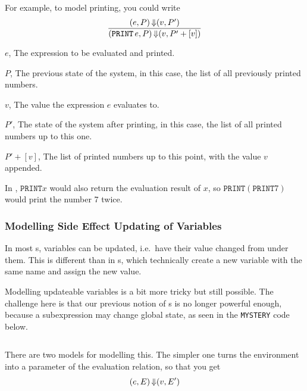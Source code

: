 For example, to model printing, you could write
\begin{equation}\label{eq:Semantic_Side_Effect_Printing}
  \frac{(e, P) \operatorname{\Downarrow} (v, P')}{(\mathtt{PRINT\,} e, P) \operatorname{\Downarrow} (v, P'+[v])}
\end{equation}
\begin{description}[noitemsep]
\item $e$, The expression to be evaluated and printed.
\item $P$, The previous state of the system, in this case, the list of all previously printed numbers.
\item $v$, The value the expression $e$ evaluates to.
\item $P'$, The state of the system after printing, in this case, the list of all printed numbers up to this one.
\item $P'+[v]$, The list of printed numbers up to this point, with the value $v$ appended.
\end{description}

\begin{remark*}
  In , $\mathtt{PRINT} x$ would also return the evaluation result of $x$, so $\mathtt{PRINT} (\mathtt{PRINT} 7)$ would print the number 7 twice.
\end{remark*}

\subsubsection{Modelling Side Effect Updating of Variables}\label{subsubsec:Model_Side_Effect_Variable_Update}
In most s, variables can be updated, i.e.\ have their value changed from under them.
This is different than in s, which technically create a new variable with the same name and assign the new value.

Modelling updateable variables is a bit more tricky but still possible.
The challenge here is that our previous notion of s is no longer powerful enough, because a subexpression may change global state, as seen in the \texttt{MYSTERY} code below.

\inputminted[frame=lines,linenos]{pascal}{./EDAP05-Concepts_Programming_Languages-Sections/Functional_Programming/Code/Global_State_Change.pas}

There are two models for modelling this.
The simpler one turns the environment into a parameter of the evaluation relation, so that you get
\begin{equation}\label{eq:Simple_Side_Effect_Variable_Update}
  (e, E) \operatorname{\Downarrow} (v, E')
\end{equation}

